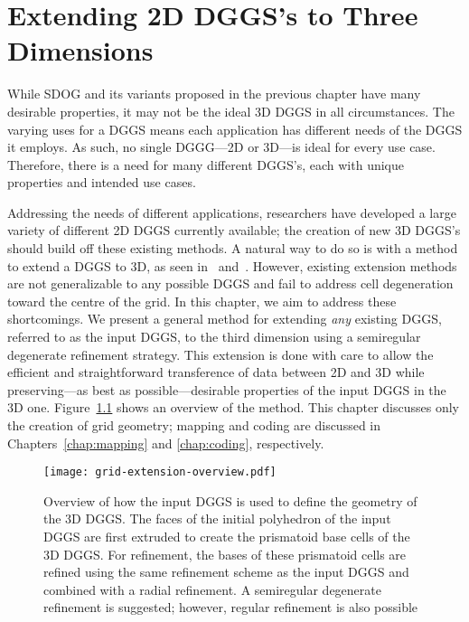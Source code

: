 \chapter{Extending 2D DGGS's to Three Dimensions} \label{chap:extension}
While SDOG and its variants proposed in the previous chapter have many desirable properties, it may not be the ideal 3D DGGS in all circumstances.
The varying uses for a DGGS means each application has different needs of the DGGS it employs.
As such, no single DGGG---2D or 3D---is ideal for every use case.
Therefore, there is a need for many different DGGS's, each with unique properties and intended use cases.


Addressing the needs of different applications, researchers have developed a large variety of different 2D DGGS currently available; the creation of new 3D DGGS's should build off these existing methods.
A natural way to do so is with a method to extend a DGGS to 3D, as seen in~\cite{xie2013interactive} and~\cite{sirdeshmukh2019utilizing}.
However, existing extension methods are not generalizable to any possible DGGS and fail to address cell degeneration toward the centre of the grid.
In this chapter, we aim to address these shortcomings.
We present a general method for extending \textit{any} existing DGGS, referred to as the input DGGS, to the third dimension using a semiregular degenerate refinement strategy.
This extension is done with care to allow the efficient and straightforward transference of data between 2D and 3D while preserving---as best as possible---desirable properties of the input DGGS in the 3D one.
Figure~\ref{fig:extension} shows an overview of the method.
This chapter discusses only the creation of grid geometry; mapping and coding are discussed in Chapters~\ref{chap:mapping} and \ref{chap:coding}, respectively.


\begin{figure}[ht!]
	\centering
	\texttt{[image: grid-extension-overview.pdf]}
	\caption[Overview of the grid extension method]{
		Overview of how the input DGGS is used to define the geometry of the 3D DGGS.
		The faces of the initial polyhedron of the input DGGS are first extruded to create the prismatoid base cells of the 3D DGGS.
		For refinement, the bases of these prismatoid cells are refined using the same refinement scheme as the input DGGS and combined with a radial refinement.
		A semiregular degenerate refinement is suggested; however, regular refinement is also possible
	}
	\label{fig:extension}
\end{figure}


